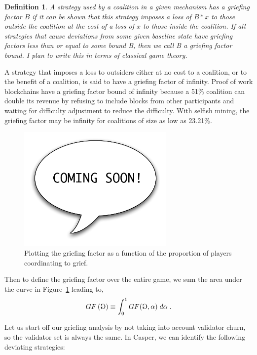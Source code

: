 \documentclass[12pt, final]{article}
\newcommand*{\todo}[1]{\color{red} #1}
\newcommand{\figref}[1]{Figure~\ref{#1}}
\newtheorem{definition}{Definition}
\newcommand{\gamesymbol}{\reflectbox{G}}
\newcommand{\GF}[1]{GF\left( #1 \right)\space}
\begin{document}
\begin{definition}
A strategy used by a coalition in a given mechanism has a \emph{griefing factor} $B$ if it can be shown that this strategy imposes a loss of $B * x$ to those outside the coalition at the cost of a loss of $x$ to those inside the coalition. If all strategies that cause deviations from some given baseline state have griefing factors less than or equal to some bound B, then we call B a \emph{griefing factor bound}. \todo{I plan to write this in terms of classical game theory.}
\end{definition}

A strategy that imposes a loss to outsiders either at no cost to a coalition, or to the benefit of a coalition, is said to have a griefing factor of infinity. Proof of work blockchains have a griefing factor bound of infinity because a 51\% coalition can double its revenue by refusing to include blocks from other participants and waiting for difficulty adjustment to reduce the difficulty. With selfish mining, the griefing factor may be infinity for coalitions of size as low as 23.21\%. \cite{selfishminingBTC}



\begin{figure}[h!bt]
	\centering
	\includegraphics[width=3in]{cs.pdf}
	\caption{Plotting the griefing factor as a function of the proportion of players coordinating to grief.}
	\label{fig:GF}
\end{figure}

Then to define the griefing factor over the entire game, we sum the area under the curve in \figref{fig:GF} leading to,
\begin{equation}
\GF{ \gamesymbol } \equiv \int_{0}^{1} GF( \gamesymbol, \alpha ) \; d\alpha \; .
\end{equation}


Let us start off our griefing analysis by not taking into account validator churn, so the validator set is always the same. In Casper, we can identify the following deviating strategies:
\end{document}

